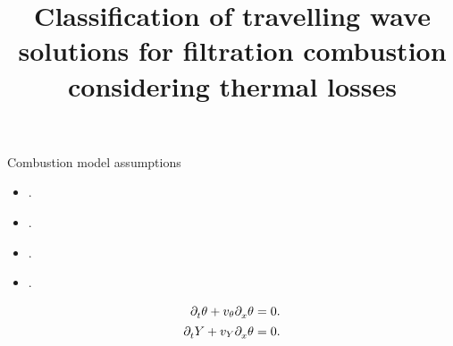 \documentclass[
  aspectratio=1610,
  c,
  handout,
  9pt,
  spanish
]{beamer}
\title{Classification of travelling wave solutions for filtration combustion considering thermal losses}
\begin{document}
\begin{frame}
    \begin{block}{Combustion model assumptions}
        \begin{itemize}
            \item .
            \item .
            \item .
            \item .
        \end{itemize}
    \end{block}

    \begin{align*}
        \difcp{\theta}{t}+v_{\theta}\difcp{\theta}{x} & =0. \\
        \difcp{Y}{t}+v_{Y}\difcp{\theta}{x}           & =0. \\
    \end{align*}
\end{frame}
\end{document}
